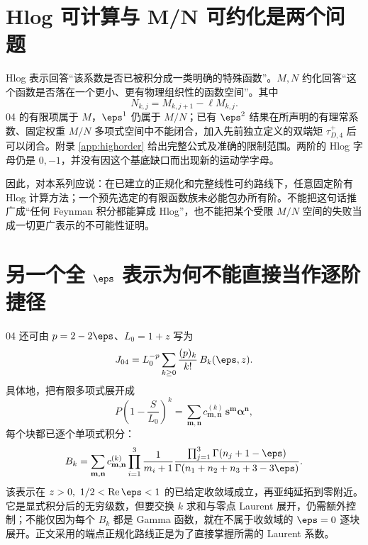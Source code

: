 \section{Hlog 可计算与 M/N 可约化是两个问题}
Hlog 表示回答“该系数是否已被积分成一类明确的特殊函数”。$M,N$ 约化回答“这个函数是否落在一个更小、更有物理组织性的函数空间”。其中
\begin{equation}
N_{k,j}=M_{k,j+1}-\ell M_{k,j}.
\end{equation}
04 的有限项属于 $M$，$\eps^1$ 仍属于 $M/N$；已有 $\eps^2$ 结果在所声明的有理常系数、固定权重 $M/N$ 多项式空间中不能闭合，加入先前独立定义的双端矩 $\tau^+_{D,4}$ 后可以闭合。附录 \ref{app:highorder} 给出完整公式及准确的限制范围。两阶的 Hlog 字母仍是 $0,-1$，并没有因这个基底缺口而出现新的运动学字母。

因此，对本系列应说：在已建立的正规化和完整线性可约路线下，任意固定阶有 Hlog 计算方法；一个预先选定的有限函数族未必能包办所有阶。不能把这句话推广成“任何 Feynman 积分都能算成 Hlog”，也不能把某个受限 $M/N$ 空间的失败当成一切更广表示的不可能性证明。

\section{另一个全 \texorpdfstring{$\eps$}{ε} 表示为何不能直接当作逐阶捷径}
04 还可由 $p=2-2\eps$、$L_0=1+z$ 写为
\begin{equation}
J_{04}=L_0^{-p}\sum_{k\ge0}\frac{(p)_k}{k!}\,B_k(\eps,z).
\end{equation}
具体地，把有限多项式展开成
\[
P\left(1-\frac S{L_0}\right)^k
=\sum_{\mathbf m,\mathbf n}c^{(k)}_{\mathbf m,\mathbf n}
\,\mathbf s^{\mathbf m}\boldsymbol\alpha^{\mathbf n},
\]
每个块都已逐个单项式积分：
\begin{equation}
B_k=\sum_{\mathbf m,\mathbf n}c^{(k)}_{\mathbf m,\mathbf n}
\prod_{i=1}^3\frac1{m_i+1}
\frac{\prod_{j=1}^3\Gamma(n_j+1-\eps)}
{\Gamma(n_1+n_2+n_3+3-3\eps)}.
\end{equation}
该表示在 $z>0,\ 1/2<\operatorname{Re}\eps<1$ 的已给定收敛域成立，再亚纯延拓到零附近。它是显式积分后的无穷级数，但要交换 $k$ 求和与零点 Laurent 展开，仍需额外控制；不能仅因为每个 $B_k$ 都是 Gamma 函数，就在不属于收敛域的 $\eps=0$ 逐块展开。正文采用的端点正规化路线正是为了直接掌握所需的 Laurent 系数。
